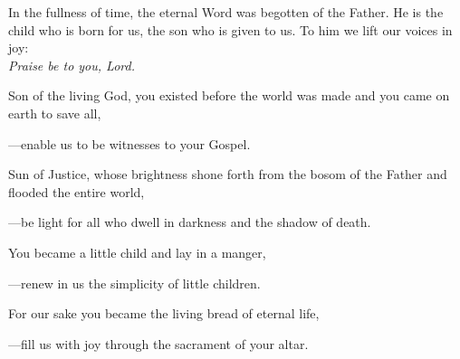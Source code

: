 \intercessions\indent

\begin{hangpar}

In the fullness of time, the eternal Word was begotten of the Father. He is the child who is born for us, the son who is given to us. To him we lift our voices in joy:\\
\emph{Praise be to you, Lord.}

\medskip Son of the living God, you existed before the world was made and you came on earth to save all,

{\color{red}---\thinspace}enable us to be witnesses to your Gospel.

\medskip Sun of Justice, whose brightness shone forth from the bosom of the Father and flooded the entire world,

{\color{red}---\thinspace}be light for all who dwell in darkness and the shadow of death.

\medskip You became a little child and lay in a manger,

{\color{red}---\thinspace}renew in us the simplicity of little children.

\medskip For our sake you became the living bread of eternal life,

{\color{red}---\thinspace}fill us with joy through the sacrament of your altar.

\medskip

\end{hangpar}